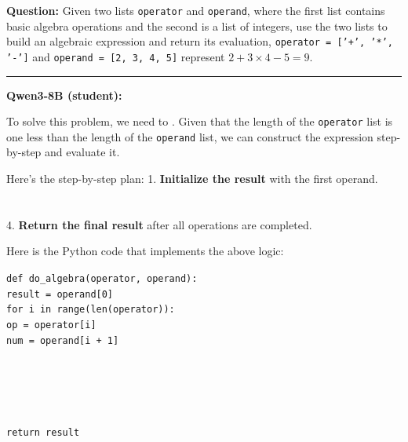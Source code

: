 \begin{ReasoningBox}[title={Case Study: Code Generation (Smaller \& Larger Setting)}, breakable]
\textbf{Question:} Given two lists \texttt{operator} and \texttt{operand}, where the first list contains basic algebra operations and the second is a list of integers, use the two lists to build an algebraic expression and return its evaluation, \eg \texttt{operator = ['+', '*', '-']} and \texttt{operand = [2, 3, 4, 5]} represent $2 + 3 \times 4 - 5 = 9$.

\medskip
\noindent\rule{\linewidth}{0.4pt}
\medskip

\textbf{Qwen3-8B (student):}

To solve this problem, we need to . Given that the length of the \texttt{operator} list is one less than the length of the \texttt{operand} list, we can construct the expression step-by-step and evaluate it.

Here's the step-by-step plan:
1. \textbf{Initialize the result} with the first operand.\\
\\
\\
4. \textbf{Return the final result} after all operations are completed.

Here is the Python code that implements the above logic:

\hspace*{1em}\texttt{def do\_algebra(operator, operand):}\\
\hspace*{2.5em}\texttt{result = operand[0]}\\
\hspace*{2.5em}\texttt{for i in range(len(operator)):}\\
\hspace*{4em}\texttt{op = operator[i]}\\
\hspace*{4em}\texttt{num = operand[i + 1]}\\
\hspace*{4em}\\
\hspace*{4em}\\
\hspace*{4em}\\
\hspace*{4em}\\
\hspace*{4em}\\
\hspace*{2.5em}\texttt{return result}


\end{ReasoningBox}
